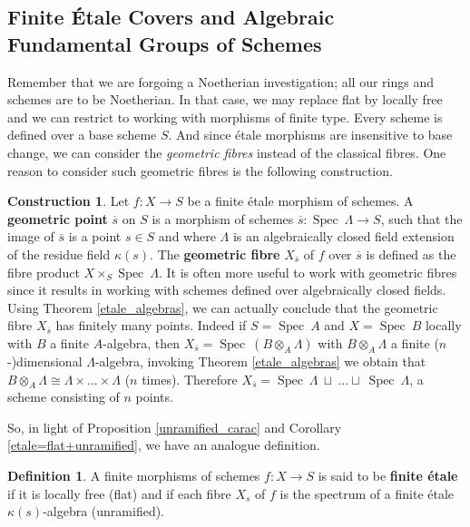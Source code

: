 \documentclass{article}
\theoremstyle{plain}
\theoremstyle{definition}
\newtheorem{definition}[theorem]{Definition}
\newtheorem{construction}[theorem]{Construction}
\DeclareMathOperator{\Spec}{Spec}
\begin{document}
\subsection{Finite \'Etale Covers and Algebraic Fundamental Groups of Schemes}


Remember that we are forgoing a Noetherian investigation; all our rings and schemes are to be Noetherian. 
In that case, we may replace flat by locally free and we can restrict to working with morphisms of finite type. 
Every scheme is defined over a base scheme $S$.
And since \'etale morphisms are insensitive to base change, we can consider the \textit{geometric fibres} instead of the classical fibres. One reason to consider such geometric fibres is the following construction.

\begin{construction}
    Let $f:X\rightarrow S$ be a finite \'etale morphism of schemes. 
    A \textbf{geometric point} $\overline{s}$ on $S$ is a morphism of schemes $\overline{s}:\Spec\:\Lambda \rightarrow S$, such that the image of $\overline{s}$ is a point $s\in S$ and where $\Lambda$ is an algebraically closed field extension of the residue field $\kappa(s)$.
    The \textbf{geometric fibre} $X_{\overline{s}}$ of $f$ over $\overline{s}$ is defined as the fibre product $X\times_S\Spec\:\Lambda$.
    It is often more useful to work with geometric fibres since it results in working with schemes defined over algebraically closed fields.
    Using Theorem \ref{etale_algebras}, we can actually conclude that the geometric fibre $X_{\overline{s}}$ has finitely many points.
    Indeed if $S = \Spec\:A$ and $X=\Spec\:B$ locally with $B$ a finite $A$-algebra, then $X_{\overline{s}} = \Spec\:(B\otimes_A\Lambda)$ with $B\otimes_A\Lambda$ a finite  ($n$-)dimensional $\Lambda$-algebra, invoking Theorem \ref{etale_algebras} we obtain that $B\otimes_A\Lambda \cong \Lambda \times ...\times\Lambda$ ($n$ times). 
    Therefore $X_{\overline{s}} = \Spec\:\Lambda \:\sqcup \:...\sqcup \:\Spec\:\Lambda$, a scheme consisting of $n$ points.
\end{construction}



\noindent So, in light of Proposition \ref{unramified_carac} and Corollary \ref{etale=flat+unramified}, we have an analogue definition. 

\begin{definition}
    A finite morphisms of schemes $f:X\rightarrow S$ is said to be \textbf{finite \'etale} if it is locally free (flat) and if each fibre $X_s$ of $f$ is the spectrum of a finite \'etale $\kappa(s)$-algebra (unramified).
\end{definition}
\end{document}
